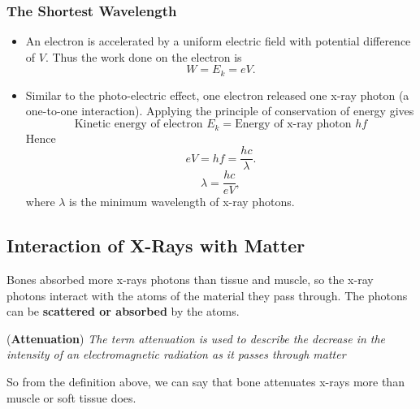 \subsubsection*{The Shortest Wavelength}
\begin{itemize}
    \item An electron is accelerated by a uniform electric field with potential difference of $V$. Thus the work done on the electron is
    \begin{equation}
        W = E_k = eV.
    \end{equation}
    \item Similar to the photo-electric effect, one electron released one x-ray photon (a one-to-one interaction). Applying the principle of conservation of energy gives
    \begin{equation}
        \text{Kinetic energy of electron } E_k = \text{Energy of x-ray photon } hf
    \end{equation}
    Hence
    \begin{equation}
        eV = hf = \frac{hc}{\lambda}.
    \end{equation}
    \begin{equation}
        \lambda = \frac{hc}{eV},
    \end{equation}
    where $\lambda$ is the minimum wavelength of x-ray photons. 
\end{itemize}

\subsection{Interaction of X-Rays with Matter}
Bones absorbed more x-rays photons than tissue and muscle, so the x-ray photons interact with the atoms of the material they pass through. The photons can be \textbf{scattered or absorbed} by the atoms. 

\begin{definition}{(\textbf{Attenuation})}
\textit{The term attenuation is used to describe the decrease in the intensity of an electromagnetic radiation as it passes through matter}
\end{definition}

So from the definition above, we can say that bone attenuates x-rays more than muscle or soft tissue does. 

